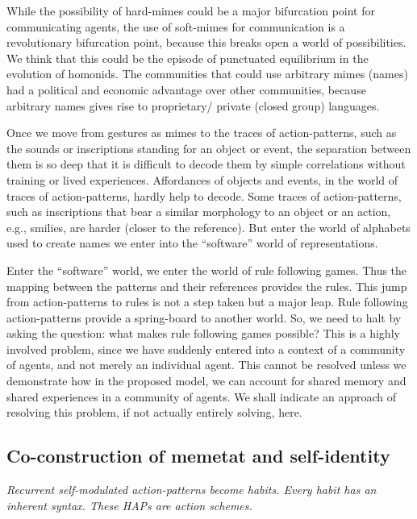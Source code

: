 While the possibility of hard-mimes could be a major bifurcation point for communicating agents, the use of soft-mimes for communication is a revolutionary bifurcation point, because this breaks open a world of possibilities. 
We think that this could be the episode of punctuated equilibrium\cite{gould1977punctuated} in the evolution of homonids. The communities that could use arbitrary mimes (names) had a political and economic advantage over other communities, because arbitrary names gives rise to proprietary/ private (closed group) languages.\cite{corballis2014recursive}

Once we move from gestures as mimes to the traces of action-patterns, such as the sounds or inscriptions standing for an object or event, the separation between them is so deep that it is difficult to decode them by simple correlations without training or lived experiences. 
Affordances of objects and events, in the world of traces of action-patterns, hardly help to decode. Some traces of action-patterns, such as inscriptions that bear a similar morphology to an object or an action, e.g., smilies, are harder (closer to the reference). But enter the world of alphabets used to create names we enter into the ``software'' world of representations. 

Enter the ``software'' world, we enter the world of rule following games. Thus the mapping between the patterns and their references provides the rules. 
This jump from action-patterns to rules is not a step taken but a major leap. 
Rule following action-patterns provide a spring-board to another world. 
So, we need to halt by asking the question: what makes rule following games possible? 
This is a highly involved problem, since we have suddenly entered into a context of a community of agents, and not merely an individual agent. 
This cannot be resolved unless we demonstrate how in the proposed model, we can account for shared memory and shared experiences in a community of agents. 
We shall indicate an approach of resolving this problem, if not actually entirely solving, here. 

\subsection{Co-construction of memetat and self-identity}

\emph{Recurrent self-modulated action-patterns become habits. Every habit has an inherent syntax. These HAPs are \textit{action schemes}\cite{piaget1970genetic}.}

